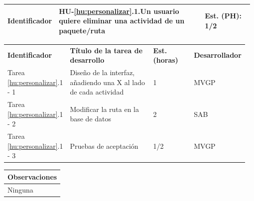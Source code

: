 \documentclass[11pt]{article}
\begin{document}
\begin{longtable}{p{0.18\linewidth}|p{0.6\linewidth}|p{0.2\linewidth}}
  \rowcolor{LightCyan}
  \textbf{Identificador} & \textbf{HU-\ref{hu:personalizar}.1}.Un usuario quiere eliminar una actividad de un paquete/ruta & \textbf{Est. (PH):} 1/2 \\
  \bottomrule
\end{longtable}
\vspace{-0.5cm}
\begin{longtable}{p{0.18\linewidth}|p{0.4\linewidth}|p{0.18\linewidth}|p{0.2\linewidth}}
  \toprule
  \textbf{Identificador} & \textbf{Título de la tarea de desarrollo} & \textbf{Est. (horas)} & \textbf{Desarrollador} \\
  Tarea \ref{hu:personalizar}.1 - 1 & Diseño de la interfaz, añadiendo una X al lado de cada actividad & 1 & MVGP\\
  Tarea \ref{hu:personalizar}.1 - 2 & Modificar la ruta en la base de datos & 2 & SAB\\
  Tarea \ref{hu:personalizar}.1 - 3 & Pruebas de aceptación & 1/2 & MVGP\\
  \bottomrule
\end{longtable}
\vspace{-0.5cm}
\begin{longtable}{p{1.028\linewidth}}
  \textbf{Observaciones}\\
  \midrule
  Ninguna\\
  \bottomrule
\end{longtable}
\end{document}
